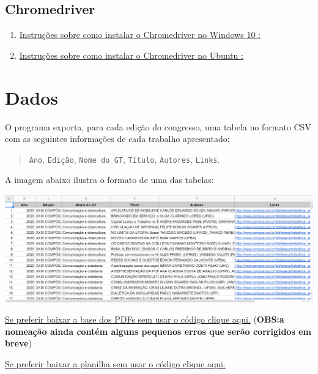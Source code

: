 \documentclass[
]{book}
\begin{document}
\hypertarget{chromedriver}{%
\subsection{Chromedriver}\label{chromedriver}}

\begin{enumerate}
\def\labelenumi{\arabic{enumi}.}
\item
  \href{https://www.youtube.com/watch?v=dz59GsdvUF8}{Instruções sobre como instalar o Chromedriver no Windows 10 :}
\item
  \href{https://medium.com/@marco.conviccao/configurando-o-chromedriver-no-ubuntu-7baaf2be7c68}{Instruções sobre como instalar o Chromedriver no Ubuntu :}
\end{enumerate}

\hypertarget{dados-3}{%
\section{Dados}\label{dados-3}}

O programa exporta, para cada edição do congresso, uma tabela no formato CSV com as seguintes informações de cada trabalho apresentado:

\begin{quote}
\texttt{Ano}, \texttt{Edição}, \texttt{Nome\ do\ GT}, \texttt{Título}, \texttt{Autores}, \texttt{Links}.
\end{quote}

A imagem abaixo ilustra o formato de uma das tabelas:

\includegraphics{img/csv.png}

\href{https://filesender.rnp.br/?s=download\&token=ae3e90f6-c8db-497f-a3e0-73958c634997}{Se preferir baixar a base dos PDFs sem usar o código clique aqui.}
(\textbf{OBS:a nomeação ainda contém alguns pequenos erros que serão corrigidos em breve})

\href{https://docs.google.com/spreadsheets/d/1VXlCD9rak-ut3_5p6UFyzOfuSgpbBcl9KDHrXe53q-0/edit?usp=sharing}{Se preferir baixar a planilha sem usar o código clique aqui.}
\end{document}
